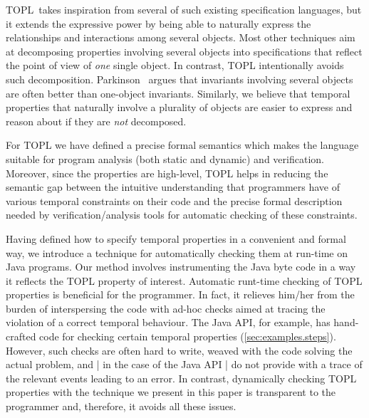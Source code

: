 \documentclass[10pt]{llncs} %
\newcommand{\TPL}{TOPL}
\begin{document}
%
\TPL \ takes inspiration from several of such existing specification languages, but it extends the expressive power by
being able to naturally express  the relationships and interactions among several objects.
Most other techniques aim at decomposing properties involving several objects into specifications that reflect the point of view of {\em one} single object.
In contrast, TOPL intentionally avoids such decomposition.
Parkinson~\cite{parkinson-iwaco2007} argues that invariants involving several objects are often better than one-object invariants.
Similarly, we believe that temporal properties that naturally involve a plurality of objects are easier to express and reason about if they are \emph{not} decomposed.

For TOPL we have defined a precise formal semantics which makes the language suitable for program analysis (both static and dynamic) and verification. Moreover, since the properties are high-level,  
TOPL helps in  reducing the semantic gap between 
the intuitive understanding that programmers have of various temporal constraints on their code 
and the precise formal description needed by verification/analysis tools for automatic checking of these constraints.

Having defined how to specify temporal properties in a convenient  and formal way, 
we introduce a technique for automatically checking them at run-time on Java programs.
Our method involves instrumenting the Java byte code in a way it reflects the TOPL property of interest.
Automatic runt-time checking of TOPL properties is beneficial for the programmer. 
In fact, it relieves him/her from the burden of 
interspersing the code with ad-hoc checks  aimed at tracing the violation of a correct temporal behaviour.
The Java API, for example, has hand-crafted code for checking certain temporal properties (\autoref{sec:examples.steps}).
However, such checks are often hard to write, weaved with the code solving the actual problem, and | in the case of the Java API |  do not provide with a trace of the relevant events leading to an error.
In contrast, dynamically checking TOPL properties  with the technique we present in this paper is transparent to the programmer and, therefore,  it avoids all these issues.
\end{document}
